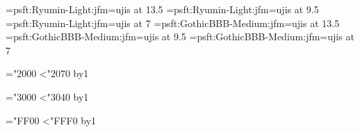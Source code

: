 
\jfont\tenmin=psft:Ryumin-Light:jfm=ujis at 13.5\jQ
\jfont\sevenmin=psft:Ryumin-Light:jfm=ujis at 9.5\jQ
\jfont\fivemin=psft:Ryumin-Light:jfm=ujis at 7\jQ
\jfont\tengt=psft:GothicBBB-Medium:jfm=ujis at 13.5\jQ
\jfont\sevengt=psft:GothicBBB-Medium:jfm=ujis at 9.5\jQ
\jfont\fivegt=psft:GothicBBB-Medium:jfm=ujis at 7\jQ

\let\mc=\tenmin
\let\gt=\tengt
\mc
{}



\luatexja@tempcnta="2000%
\loop\ifnum\luatexja@tempcnta<"2070%
  \advance\luatexja@tempcnta by1
\repeat

\luatexja@tempcnta="3000%
\loop\ifnum\luatexja@tempcnta<"3040%
  \advance\luatexja@tempcnta by1
\repeat

\luatexja@tempcnta="FF00%
\loop\ifnum\luatexja@tempcnta<"FFF0%
  \advance\luatexja@tempcnta by1
\repeat
\endinput